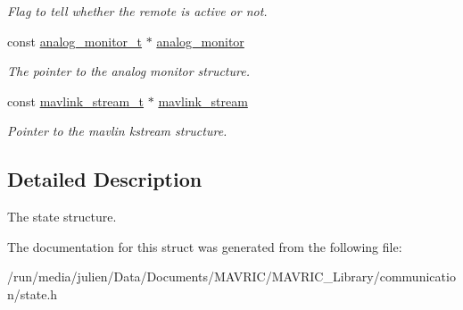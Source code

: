 \begin{DoxyCompactItemize}
\begin{DoxyCompactList}\small\item\em Flag to tell whether the remote is active or not. \end{DoxyCompactList}\item 
\hypertarget{structstate__t_a212c3db931148c14342ac288c5c90fcb}{const \hyperlink{structanalog__monitor__t}{analog\+\_\+monitor\+\_\+t} $\ast$ \hyperlink{structstate__t_a212c3db931148c14342ac288c5c90fcb}{analog\+\_\+monitor}}\label{structstate__t_a212c3db931148c14342ac288c5c90fcb}

\begin{DoxyCompactList}\small\item\em The pointer to the analog monitor structure. \end{DoxyCompactList}\item 
\hypertarget{structstate__t_aecc68b1c179959dabe7499670504b4b7}{const \hyperlink{structmavlink__stream__t}{mavlink\+\_\+stream\+\_\+t} $\ast$ \hyperlink{structstate__t_aecc68b1c179959dabe7499670504b4b7}{mavlink\+\_\+stream}}\label{structstate__t_aecc68b1c179959dabe7499670504b4b7}

\begin{DoxyCompactList}\small\item\em Pointer to the mavlin kstream structure. \end{DoxyCompactList}\end{DoxyCompactItemize}


\subsection{Detailed Description}
The state structure. 

The documentation for this struct was generated from the following file\+:\begin{DoxyCompactItemize}
\item 
/run/media/julien/\+Data/\+Documents/\+M\+A\+V\+R\+I\+C/\+M\+A\+V\+R\+I\+C\+\_\+\+Library/communication/state.\+h\end{DoxyCompactItemize}
